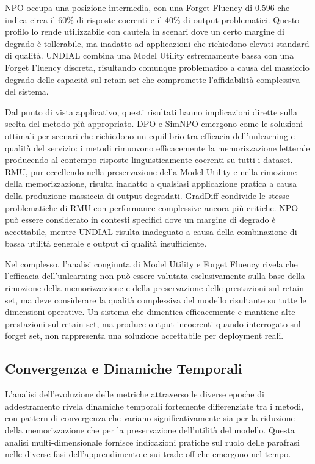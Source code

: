 NPO occupa una posizione intermedia, con una Forget Fluency di 0.596 che indica circa il 60\% di risposte coerenti e il 40\% di output problematici. Questo profilo lo rende utilizzabile con cautela in scenari dove un certo margine di degrado è tollerabile, ma inadatto ad applicazioni che richiedono elevati standard di qualità. UNDIAL combina una Model Utility estremamente bassa con una Forget Fluency discreta, risultando comunque problematico a causa del massiccio degrado delle capacità sul retain set che compromette l'affidabilità complessiva del sistema.

Dal punto di vista applicativo, questi risultati hanno implicazioni dirette sulla scelta del metodo più appropriato. DPO e SimNPO emergono come le soluzioni ottimali per scenari che richiedono un equilibrio tra efficacia dell'unlearning e qualità del servizio: i metodi rimuovono efficacemente la memorizzazione letterale producendo al contempo risposte linguisticamente coerenti su tutti i dataset. RMU, pur eccellendo nella preservazione della Model Utility e nella rimozione della memorizzazione, risulta inadatto a qualsiasi applicazione pratica a causa della produzione massiccia di output degradati. GradDiff condivide le stesse problematiche di RMU con performance complessive ancora più critiche. NPO può essere considerato in contesti specifici dove un margine di degrado è accettabile, mentre UNDIAL risulta inadeguato a causa della combinazione di bassa utilità generale e output di qualità insufficiente.

Nel complesso, l'analisi congiunta di Model Utility e Forget Fluency rivela che l'efficacia dell'unlearning non può essere valutata esclusivamente sulla base della rimozione della memorizzazione e della preservazione delle prestazioni sul retain set, ma deve considerare la qualità complessiva del modello risultante su tutte le dimensioni operative. Un sistema che dimentica efficacemente e mantiene alte prestazioni sul retain set, ma produce output incoerenti quando interrogato sul forget set, non rappresenta una soluzione accettabile per deployment reali.

\subsection{Convergenza e Dinamiche Temporali}
L'analisi dell'evoluzione delle metriche attraverso le diverse epoche di addestramento rivela dinamiche temporali fortemente differenziate tra i metodi, con pattern di convergenza che variano significativamente sia per la riduzione della memorizzazione che per la preservazione dell'utilità del modello. Questa analisi multi-dimensionale fornisce indicazioni pratiche sul ruolo delle parafrasi nelle diverse fasi dell'apprendimento e sui trade-off che emergono nel tempo.

